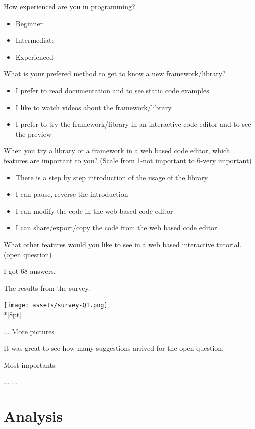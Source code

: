 \documentclass[12pt, a4paper, oneside, openright, medskipamount]{report}
\begin{document}
\noindent How experienced are you in programming?
\begin{itemize}[noitemsep]
\item Beginner
\item Intermediate
\item Experienced
\end{itemize}

\noindent What is your prefered method to get to know a new framework/library?
\begin{itemize}[noitemsep]
\item I prefer to read documentation and to see static code examples
\item I like to watch videos about the framework/library
\item I prefer to try the framework/library in an interactive code editor and to see the preview
\end{itemize}

\noindent When you try a library or a framework in a web based code editor, which features are important to you? (Scale from 1-not important to 6-very important)
\begin{itemize}[noitemsep]
\item There is a step by step introduction of the usage of the library
\item I can pause, reverse the introduction
\item I can modify the code in the web based code editor
\item I can share/export/copy the code from the web based code editor
\end{itemize}

What other features would you like to see in a web based interactive tutorial.
(open question)

I got 68 answers.

The results from the survey.

\texttt{[image: assets/survey-Q1.png]}\\*[8pt]

... More pictures

It was great to see how many suggestions arrived for the open question.

Most importants:

...
...




\section{Analysis}
\end{document}
